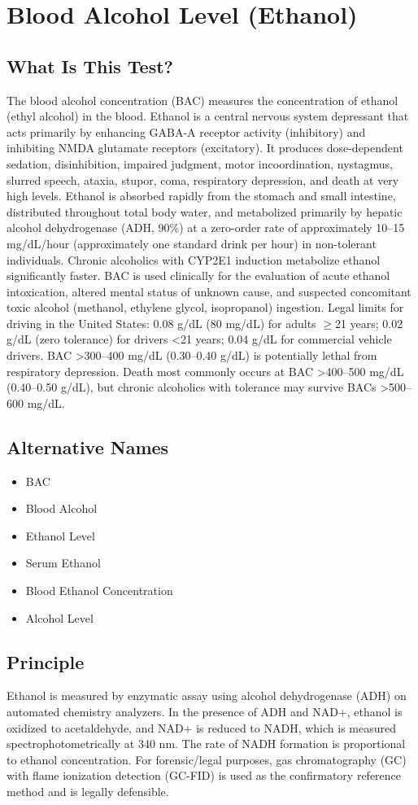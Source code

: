 \chapter{Blood Alcohol Level (Ethanol)}
\section*{What Is This Test?}
The blood alcohol concentration (BAC) measures the concentration of ethanol (ethyl alcohol) in the blood. Ethanol is a central nervous system depressant that acts primarily by enhancing GABA-A receptor activity (inhibitory) and inhibiting NMDA glutamate receptors (excitatory). It produces dose-dependent sedation, disinhibition, impaired judgment, motor incoordination, nystagmus, slurred speech, ataxia, stupor, coma, respiratory depression, and death at very high levels. Ethanol is absorbed rapidly from the stomach and small intestine, distributed throughout total body water, and metabolized primarily by hepatic alcohol dehydrogenase (ADH, 90\%) at a zero-order rate of approximately 10--15 mg/dL/hour (approximately one standard drink per hour) in non-tolerant individuals. Chronic alcoholics with CYP2E1 induction metabolize ethanol significantly faster. BAC is used clinically for the evaluation of acute ethanol intoxication, altered mental status of unknown cause, and suspected concomitant toxic alcohol (methanol, ethylene glycol, isopropanol) ingestion. Legal limits for driving in the United States: 0.08 g/dL (80 mg/dL) for adults $\geq$21 years; 0.02 g/dL (zero tolerance) for drivers <21 years; 0.04 g/dL for commercial vehicle drivers. BAC >300--400 mg/dL (0.30--0.40 g/dL) is potentially lethal from respiratory depression. Death most commonly occurs at BAC >400--500 mg/dL (0.40--0.50 g/dL), but chronic alcoholics with tolerance may survive BACs >500--600 mg/dL.
\section*{Alternative Names}
\begin{itemize}
  \item BAC
  \item Blood Alcohol
  \item Ethanol Level
  \item Serum Ethanol
  \item Blood Ethanol Concentration
  \item Alcohol Level
\end{itemize}
\section*{Principle}
Ethanol is measured by enzymatic assay using alcohol dehydrogenase (ADH) on automated chemistry analyzers. In the presence of ADH and NAD+, ethanol is oxidized to acetaldehyde, and NAD+ is reduced to NADH, which is measured spectrophotometrically at 340 nm. The rate of NADH formation is proportional to ethanol concentration. For forensic/legal purposes, gas chromatography (GC) with flame ionization detection (GC-FID) is used as the confirmatory reference method and is legally defensible.
